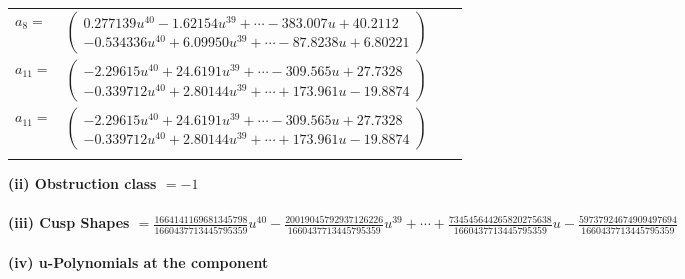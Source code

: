 \documentclass[1p]{elsarticle_modified}
\theoremstyle{definition}
\begin{document}
\begin{tabular}{m{7pt} m{180pt} m{7pt} m{180pt} }
\flushright $a_{8}=$&$\begin{pmatrix}0.277139 u^{40}-1.62154 u^{39}+\cdots-383.007 u+40.2112\\-0.534336 u^{40}+6.09950 u^{39}+\cdots-87.8238 u+6.80221\end{pmatrix}$ \\
\flushright $a_{11}=$&$\begin{pmatrix}-2.29615 u^{40}+24.6191 u^{39}+\cdots-309.565 u+27.7328\\-0.339712 u^{40}+2.80144 u^{39}+\cdots+173.961 u-19.8874\end{pmatrix}$\\ \flushright $a_{11}=$&$\begin{pmatrix}-2.29615 u^{40}+24.6191 u^{39}+\cdots-309.565 u+27.7328\\-0.339712 u^{40}+2.80144 u^{39}+\cdots+173.961 u-19.8874\end{pmatrix}$\\&\end{tabular}
\flushleft \textbf{(ii) Obstruction class $= -1$}\\~\\
\flushleft \textbf{(iii) Cusp Shapes $= \frac{1664141169681345798}{1660437713445795359} u^{40}-\frac{20019045792937126226}{1660437713445795359} u^{39}+\cdots+\frac{734545644265820275638}{1660437713445795359} u-\frac{59737924674909497694}{1660437713445795359}$}\\~\\
\newpage\renewcommand{\arraystretch}{1}
\flushleft \textbf{(iv) u-Polynomials at the component}\newline \\
\end{document}
